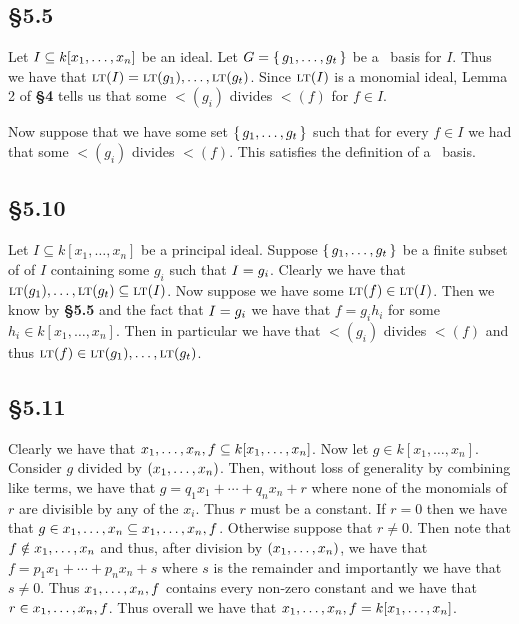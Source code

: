 \documentclass[letterpaper]{article}
\begin{document}
\clearpage

\subsection*{\S 5.5}

Let $I \subseteq k\bqty{x_{1}, \ldots, x_{n}}$ be an ideal.
Let $G = \set{g_{1}, \ldots, g_{t}}$ be a \Grobner\ basis for $I$.
Thus we have that $\gen{\lt(I)} = \gen{\lt(g_{1}), \ldots, \lt(g_{t})}$.
Since $\gen{\lt(I)}$ is a monomial ideal, Lemma 2 of \textbf{\S 4} tells us that some $\lt(g_{i})$ divides $\lt(f)$ for $f \in I$.

Now suppose that we have some set $\set{g_{1}, \ldots, g_{t}}$ such that for every $f \in I$ we had that some $\lt(g_{i})$ divides $\lt(f)$.
This satisfies the definition of a \Grobner\ basis.

\subsection*{\S 5.10}

Let $I \subseteq k[x_{1}, \ldots, x_{n}]$ be a principal ideal.
Suppose $\set{g_{1}, \ldots, g_{t}}$ be a finite subset of of $I$ containing some $g_{i}$ such that $I = \gen{g_{i}}$.
Clearly we have that $\gen{\lt(g_{1}), \ldots, \lt(g_{t})} \subseteq \gen{\lt(I)}$.
Now suppose we have some $\lt(f) \in \gen{\lt(I)}$.
Then we know by \textbf{\S 5.5} and the fact that $I = \gen{g_{i}}$ we have that $f = g_{i} h_{i}$ for some $h_{i} \in k[x_{1}, \ldots, x_{n}]$.
Then in particular we have that $\lt(g_{i})$ divides $\lt(f)$ and thus $\lt(f) \in \gen{\lt(g_{1}), \ldots, \lt(g_{t})}$.

\subsection*{\S 5.11}

Clearly we have that $\gen{x_{1}, \ldots, x_{n}, f} \subseteq k[x_{1}, \ldots, x_{n}]$.
Now let $g \in k[x_{1}, \ldots, x_{n}]$.
Consider $g$ divided by $\pqty{x_{1}, \ldots, x_{n}}$.
Then, without loss of generality by combining like terms, we have that $g = q_{1}x_{1} + \cdots + q_{n}x_{n} + r$ where none of the monomials of $r$ are divisible by any of the $x_{i}$.
Thus $r$ must be a constant.
If $r = 0$ then we have that $g \in \gen{x_{1}, \ldots, x_{n}} \subseteq \gen{x_{1}, \ldots, x_{n}, f}$.
Otherwise suppose that $r \neq 0$.
Then note that $f \notin \gen{x_{1}, \ldots, x_{n}}$ and thus, after division by $\pqty{x_{1}, \ldots, x_{n}}$, we have that $f = p_{1}x_{1} + \cdots + p_{n}x_{n} + s$ where $s$ is the remainder and importantly we have that $s \neq 0$.
Thus $\gen{x_{1}, \ldots, x_{n}, f}$ contains every non-zero constant and we have that $r \in \gen{x_{1}, \ldots, x_{n}, f}$.
Thus overall we have that $\gen{x_{1}, \ldots, x_{n}, f} = k[x_{1}, \ldots, x_{n}]$.
\end{document}

